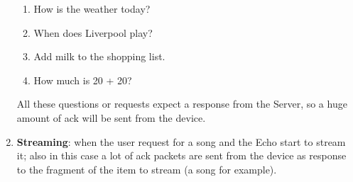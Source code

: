 \documentclass[sigconf]{acmart}
\begin{document}
\begin{enumerate}
\begin{enumerate}
            \item How is the weather today?
            \item When does Liverpool play?
            \item Add milk to the shopping list.
            \item How much is 20 + 20?
        \end{enumerate}
        All these questions or requests expect a response from the Server, so a huge amount of ack will be sent from the device.
        \item \textbf{Streaming}: when the user request for a song and the Echo start to stream it; also in this case a lot of ack packets are sent from the device as response to the fragment of the item to stream (a song for example).
    \end{enumerate}
\end{document}
